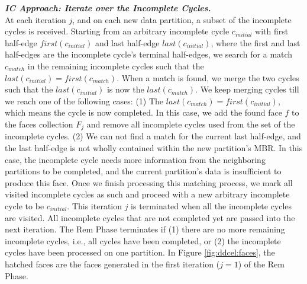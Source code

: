 \vspace{4pt}
\textit{\textbf{IC Approach: Iterate over the Incomplete Cycles.}}
\\
At each iteration $j$, and on each new data partition, a subset of the incomplete cycles is received. 
Starting from an arbitrary incomplete cycle $c_{initial}$ with first half-edge $first(c_{initial})$ and last half-edge $last(c_{initial})$, where the first and last half-edges are the incomplete cycle's terminal half-edges, we search for a match $c_{match}$ in the remaining incomplete cycles such that the $last(c_{initial}) = first(c_{match})$. When a match is found, we merge the two cycles such that the $last(c_{initial})$ is now the $last(c_{match})$. We keep merging cycles till we reach one of the following cases:
(1) The $last(c_{match}) = first(c_{initial})$, which means the cycle is now completed. In this case, we add the found face $f$ to the faces collection $F_j$ and remove all incomplete cycles used from the set of the incomplete cycles.
(2) We can not find a match for the current last half-edge, and the last half-edge is not wholly contained within the new partition's MBR. In this case, the incomplete cycle needs more information from the neighboring partitions to be completed, and the current partition's data is insufficient to produce this face.
Once we finish processing this matching process, we mark all visited incomplete cycles as such and proceed with a new arbitrary incomplete cycle to be $c_{initial}$.
This iteration $j$ is terminated when all the incomplete cycles are visited. All incomplete cycles that are not completed yet are passed into the next iteration.
The Rem Phase terminates if (1) there are no more remaining incomplete cycles, i.e., all cycles have been completed, or (2) the incomplete cycles have been processed on one partition.
In Figure \ref{fig:ddcel:faces}, the hatched faces are the faces generated in the first iteration ($j=1$) of the Rem Phase.
